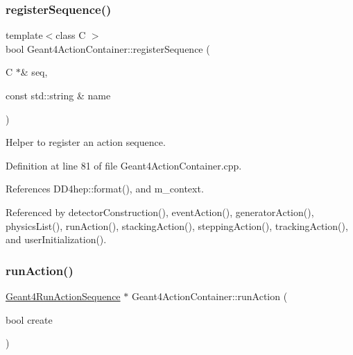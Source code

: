 \subsubsection{\texorpdfstring{register\+Sequence()}{registerSequence()}}
{\footnotesize\ttfamily template$<$class C $>$ \\
bool Geant4\+Action\+Container\+::register\+Sequence (\begin{DoxyParamCaption}\item[{C $\ast$\&}]{seq,  }\item[{const std\+::string \&}]{name }\end{DoxyParamCaption})\hspace{0.3cm}{\ttfamily [protected]}}



Helper to register an action sequence. 



Definition at line 81 of file Geant4\+Action\+Container.\+cpp.



References D\+D4hep\+::format(), and m\+\_\+context.



Referenced by detector\+Construction(), event\+Action(), generator\+Action(), physics\+List(), run\+Action(), stacking\+Action(), stepping\+Action(), tracking\+Action(), and user\+Initialization().

\hypertarget{class_d_d4hep_1_1_simulation_1_1_geant4_action_container_a5ce39c42386a93c9e446d8651495c11e}{}\label{class_d_d4hep_1_1_simulation_1_1_geant4_action_container_a5ce39c42386a93c9e446d8651495c11e} 
\subsubsection{\texorpdfstring{run\+Action()}{runAction()}\hspace{0.1cm}{\footnotesize\ttfamily [1/2]}}
{\footnotesize\ttfamily \hyperlink{class_d_d4hep_1_1_simulation_1_1_geant4_run_action_sequence}{Geant4\+Run\+Action\+Sequence} $\ast$ Geant4\+Action\+Container\+::run\+Action (\begin{DoxyParamCaption}\item[{bool}]{create }\end{DoxyParamCaption})}



